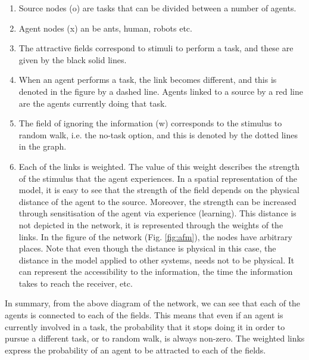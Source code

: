 \documentclass[final,5p,times,twocolumn]{elsarticle}
\begin{document}
\begin{enumerate}
\item Source nodes (o) are tasks that can be divided between a number of agents.
\item Agent nodes (x) an be ants, human,  robots etc.
\item The attractive fields correspond to stimuli to perform a task, and these are given by the black solid lines.
\item When an agent performs a task, the link becomes different, and this is denoted in the figure by a dashed line. Agents linked to a source by a red line are the agents currently doing that task. 
\item The field of ignoring the information (w) corresponds to the stimulus to random walk, i.e. the no-task option, and this is denoted by the dotted lines in the graph. 
\item Each of the links is weighted. The value of this weight describes the strength of the stimulus that the agent experiences. In a spatial representation of the model, it is easy to see that the strength of the field depends on the physical distance of the agent to the source. Moreover, the strength can be increased through sensitisation of the agent via experience (learning). This distance is not depicted in the network, it is represented through the weights of the links. In the figure of the network (Fig. \ref{fig:afm}), the nodes have arbitrary places. Note that even though the distance is physical in this case, the distance in the model applied to other systems, needs not to be physical. It can represent the accessibility to the information, the time the information takes to reach the receiver, etc. 
\end{enumerate}
In summary, from the above diagram of the network, we can see that each of the agents is connected to each of the fields. This means that even if an agent is currently involved in a task, the probability that it stops doing it in order to pursue a different task, or to random walk, is always non-zero. The weighted links express the probability of an agent to be attracted to each of the fields.
\end{document}
